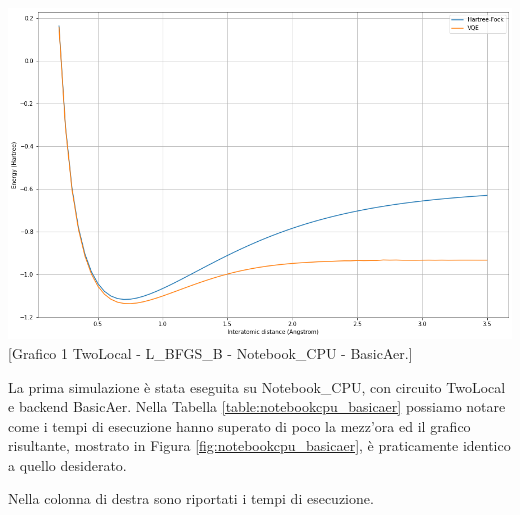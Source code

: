 \begin{minipage}[b]{0.59\textwidth}
    \centering
    \includegraphics[width=1.0\textwidth]{Images/Capitolo3/Plots/H2_twolocal_ry_rz_cz_basic_cpu_plot.png}
    [Grafico 1 \newline TwoLocal - L\_BFGS\_B - Notebook\_CPU - BasicAer.]{}
    \label{fig:notebookcpu_basicaer}
\end{minipage}
\noindent
La prima simulazione è stata eseguita su Notebook\_CPU, con circuito TwoLocal e backend BasicAer.
Nella Tabella \ref{table:notebookcpu_basicaer} possiamo notare come i tempi di esecuzione hanno superato di poco la mezz'ora ed il grafico risultante, mostrato in Figura \ref{fig:notebookcpu_basicaer}, è praticamente identico a quello desiderato.
\begin{minipage}[b]{0.39\textwidth}
    \captionsetup{type=table}
    \caption[Risultati seconda simulazione.]{Nella colonna di destra sono riportati i tempi di esecuzione.}
    \label{table:notebookcpu_aer}
\end{minipage}
